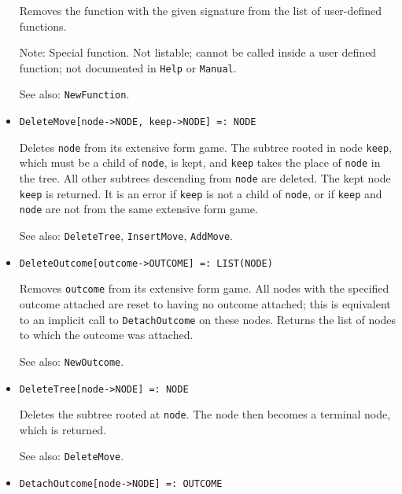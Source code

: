 \begin{itemize}
\bd
Removes the function with the given signature
from the list of user-defined functions.
\item [Note:] Special function. Not listable; cannot be called inside
a user defined function; not documented in \verb+Help+ or \verb+Manual+.  
\item [See also:] \verb+NewFunction+.
\ed

\item{}
\protect \large \begin{verbatim}
DeleteMove[node->NODE, keep->NODE] =: NODE
\end{verbatim}\normalsize

\bd
Deletes \verb+node+ from its extensive form game.  The
subtree rooted in node \verb+keep+, which must be a child of
\verb+node+, is kept, and \verb+keep+ takes the place of \verb+node+ in
the tree.  All other subtrees descending from \verb+node+ are deleted.
The kept node \verb+keep+ is returned.  It is an error if \verb+keep+
is not a child of \verb+node+, or if \verb+keep+ and \verb+node+ are not
from the same extensive form game.
\item [See also:] \verb+DeleteTree+, \verb+InsertMove+, \verb+AddMove+.
\ed

\item{}
\protect \large \begin{verbatim}
DeleteOutcome[outcome->OUTCOME] =: LIST(NODE)
\end{verbatim}\normalsize

\bd
Removes \verb+outcome+ from its extensive
form game.  All nodes with the specified outcome attached are reset to
having no outcome attached; this is equivalent to an implicit call to
\verb+DetachOutcome+ on these nodes.  Returns the list of nodes to which
the outcome was attached.
\item [See also:] \verb+NewOutcome+.
\ed

\item{}
\protect \large \begin{verbatim}
DeleteTree[node->NODE] =: NODE
\end{verbatim}\normalsize

\bd
Deletes the subtree rooted at \verb+node+.  The
node then becomes a terminal node, which is returned.
\item [See also:] \verb+DeleteMove+.
\ed

\item{}
\protect \large \begin{verbatim}
DetachOutcome[node->NODE] =: OUTCOME
\end{verbatim}\normalsize


\end{itemize}
